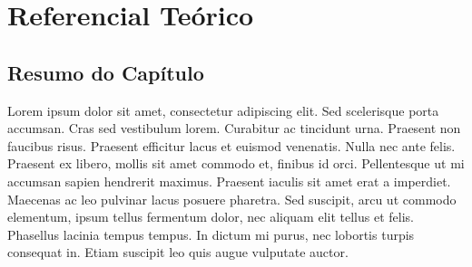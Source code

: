\chapter{Referencial Teórico}
\label{cap-referencial-teorico}

\section{Resumo do Capítulo}
\label{rt-resumo}

Lorem ipsum dolor sit amet, consectetur adipiscing elit. Sed scelerisque porta accumsan. Cras sed vestibulum lorem. Curabitur ac tincidunt urna. Praesent non faucibus risus. Praesent efficitur lacus et euismod venenatis. Nulla nec ante felis. Praesent ex libero, mollis sit amet commodo et, finibus id orci. Pellentesque ut mi accumsan sapien hendrerit maximus. Praesent iaculis sit amet erat a imperdiet. Maecenas ac leo pulvinar lacus posuere pharetra. Sed suscipit, arcu ut commodo elementum, ipsum tellus fermentum dolor, nec aliquam elit tellus et felis. Phasellus lacinia tempus tempus. In dictum mi purus, nec lobortis turpis consequat in. Etiam suscipit leo quis augue vulputate auctor.
